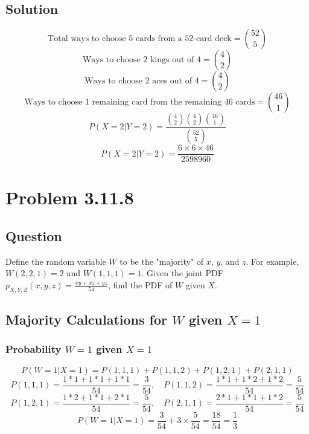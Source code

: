 \documentclass[12pt]{article}
\begin{document}
\subsection*{Solution}
\[
\text{Total ways to choose 5 cards from a 52-card deck} = \binom{52}{5}
\]
\[
\text{Ways to choose 2 kings out of 4} = \binom{4}{2}
\]
\[
\text{Ways to choose 2 aces out of 4} = \binom{4}{2}
\]
\[
\text{Ways to choose 1 remaining card from the remaining 46 cards} = \binom{46}{1}
\]
\[
P(X = 2 | Y = 2) = \frac{\binom{4}{2} \binom{4}{2} \binom{46}{1}}{\binom{52}{5}}
\]
\[
P(X = 2 | Y = 2) = \frac{6 \times 6 \times 46}{2598960}
\]
\pagebreak

\section*{Problem 3.11.8}
\subsection*{Question}
Define the random variable \( W \) to be the "majority" of \( x \), \( y \), and \( z \). For example, \( W(2, 2, 1) = 2 \) and \( W(1, 1, 1) = 1 \). Given the joint PDF \( p_{X,Y,Z}(x, y, z) = \frac{xy + xz + yz}{54} \), find the PDF of \( W \) given \( X \).

\subsection*{Majority Calculations for \( W \) given \( X = 1 \)}
\subsubsection*{Probability \( W = 1 \) given \( X = 1 \)}
\[
P(W = 1 | X = 1) = P(1, 1, 1) + P(1, 1, 2) + P(1, 2, 1) + P(2, 1, 1)
\]
\[
P(1, 1, 1) = \frac{1*1 + 1*1 + 1*1}{54} = \frac{3}{54}, \quad
P(1, 1, 2) = \frac{1*1 + 1*2 + 1*2}{54} = \frac{5}{54}
\]
\[
P(1, 2, 1) = \frac{1*2 + 1*1 + 2*1}{54} = \frac{5}{54}, \quad
P(2, 1, 1) = \frac{2*1 + 1*1 + 1*2}{54} = \frac{5}{54}
\]
\[
P(W = 1 | X = 1) = \frac{3}{54} + 3 \times \frac{5}{54} = \frac{18}{54} = \frac{1}{3}
\]
\end{document}
